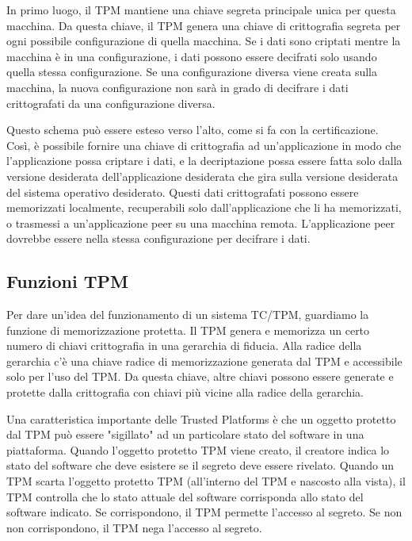 \singlespacing

In primo luogo, il TPM mantiene una chiave segreta principale unica per questa macchina. Da questa chiave, il TPM genera una chiave di crittografia segreta per ogni possibile configurazione di quella macchina. Se i dati sono criptati mentre la macchina è in una configurazione, i dati possono essere decifrati solo usando quella stessa configurazione. Se una configurazione diversa viene creata sulla macchina, la nuova configurazione non sarà in grado di decifrare i dati crittografati da una configurazione diversa.

\singlespacing

Questo schema può essere esteso verso l'alto, come si fa con la certificazione. Così, è possibile fornire una chiave di crittografia ad un'applicazione in modo che l'applicazione possa criptare i dati, e la decriptazione possa essere fatta solo dalla versione desiderata dell'applicazione desiderata che gira sulla versione desiderata del sistema operativo desiderato. Questi dati crittografati possono essere memorizzati localmente, recuperabili solo dall'applicazione che li ha memorizzati, o trasmessi a un'applicazione peer su una macchina remota. L'applicazione peer dovrebbe essere nella stessa configurazione per decifrare i dati.
\newpage
\subsection{Funzioni TPM}
Per dare un'idea del funzionamento di un sistema TC/TPM, guardiamo la funzione di memorizzazione protetta. Il TPM genera e memorizza un certo numero di chiavi crittografia in una gerarchia di fiducia. Alla radice della gerarchia c'è una chiave radice di memorizzazione generata dal TPM e accessibile solo per l'uso del TPM. Da questa chiave, altre chiavi possono essere generate e protette dalla crittografia con chiavi più vicine alla radice della gerarchia.

Una caratteristica importante delle Trusted Platforms è che un oggetto protetto dal TPM può essere "sigillato" ad un particolare stato del software in una piattaforma. Quando l'oggetto protetto TPM viene creato, il creatore indica lo stato del software che deve esistere se il segreto deve essere rivelato. Quando un TPM scarta l'oggetto protetto TPM (all'interno del TPM e nascosto alla vista), il TPM controlla che lo stato attuale del software corrisponda allo stato del software indicato. Se corrispondono, il TPM permette l'accesso al segreto. Se non non corrispondono, il TPM nega l'accesso al segreto.

